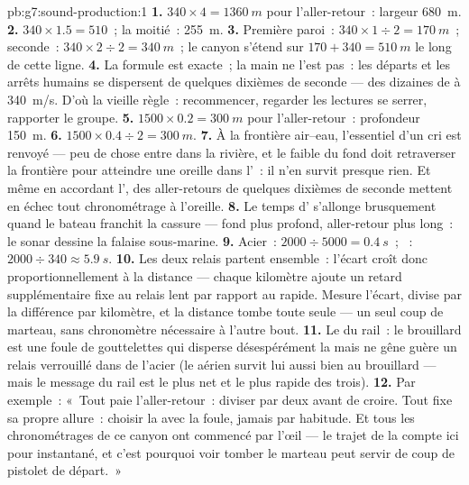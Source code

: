 \begin{solution}{pb:g7:sound-production:1}
\textbf{1.} $340 \times 4 = \qty{1360}{m}$ pour l'aller-retour~:
largeur \qty{680}{m}.
\textbf{2.} $340 \times 1.5 = 510$~; la moitié~: \qty{255}{m}.
\textbf{3.} Première paroi~: $340 \times 1 \div 2 = \qty{170}{m}$~;
seconde~: $340 \times 2 \div 2 = \qty{340}{m}$~; le canyon s'étend
sur $170 + 340 = \qty{510}{m}$ le long de cette ligne.
\textbf{4.} La formule est exacte~; la main ne l'est pas~: les
départs et les arrêts humains se dispersent de quelques dixièmes de
seconde --- des dizaines de  à \qty{340}{m/s}. D'où la vieille
règle~: recommencer, regarder les lectures se serrer, rapporter le
groupe.
\textbf{5.} $1500 \times 0.2 = \qty{300}{m}$ pour l'aller-retour~:
profondeur \qty{150}{m}.
\textbf{6.} $1500 \times 0.4 \div 2 = \qty{300}{m}$.
\textbf{7.} À la frontière air--eau, l'essentiel d'un cri est
renvoyé --- peu de chose entre dans la rivière, et le faible  du
fond doit retraverser la frontière pour atteindre une oreille dans
l'~: il n'en survit presque rien. Et même en accordant l', des
aller-retours de quelques dixièmes de seconde mettent en échec tout
chronométrage à l'oreille.
\textbf{8.} Le temps d' s'allonge brusquement quand le bateau
franchit la cassure --- fond plus profond, aller-retour plus long~:
le sonar dessine la falaise sous-marine.
\textbf{9.} Acier~: $2000 \div 5000 = \qty{0.4}{s}$~; ~:
$2000 \div 340 \approx \qty{5.9}{s}$.
\textbf{10.} Les deux relais partent ensemble~: l'écart croît donc
proportionnellement à la distance --- chaque kilomètre ajoute un
retard supplémentaire fixe au relais lent par rapport au rapide.
Mesure l'écart, divise par la différence par kilomètre, et la
distance tombe toute seule --- un seul coup de marteau, sans
chronomètre nécessaire à l'autre bout.
\textbf{11.} Le  du rail~: le brouillard est une foule de
gouttelettes qui disperse désespérément la \emph{} mais ne
gêne guère un relais verrouillé dans de l'acier  (le 
aérien survit lui aussi bien au brouillard --- mais le message du
rail est le plus net et le plus rapide des trois).
\textbf{12.} Par exemple~: «~Tout  paie l'aller-retour~: diviser
par deux avant de croire. Tout  fixe sa propre allure~: choisir
la  avec la foule, jamais par habitude. Et tous les
chronométrages de ce canyon ont commencé par l'œil --- le trajet de
la  compte ici pour instantané, et c'est pourquoi voir tomber
le marteau peut servir de coup de pistolet de départ.~»
\end{solution}
